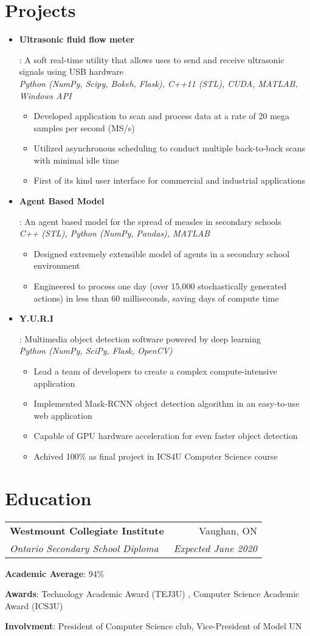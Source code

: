 \documentclass[letterpaper,10pt]{article}
\makeatletter
\newcommand{\resumeItem}[2]{
  \item\small{
    \textbf{#1}{: #2 \vspace{-2pt}}
  }
}
\newcommand{\resumeItemNoBullet}[2]{
  \item[]\small{
    \hspace{-9pt}\textbf{#1}{: #2 \vspace{-6pt}}
  }
}
\newcommand{\resumeSubheading}[4]{
  \vspace{-1pt}\item[]
  \begin{tabular*}{0.98\textwidth}{l@{\extracolsep{\fill}}r}
      \hspace{-10pt}\textbf{#1} & #2 \\
      \hspace{-10pt}\textit{\small#3} & \textit{\small #4} \\
    \end{tabular*}\vspace{-5pt}
}
\newcommand{\resumeSubItem}[2]{\resumeItem{#1}{#2}\vspace{-4pt}}
\newcommand{\resumeSubHeadingListStart}{\begin{itemize}[leftmargin=*]}
\newcommand{\resumeSubHeadingListEnd}{\end{itemize}}
\newcommand{\shorterSection}[1]{\vspace{-10pt}\section{#1}}
\makeatother
\begin{document}
\shorterSection{Projects}
  \resumeSubHeadingListStart
    \resumeSubItem{Ultrasonic fluid flow meter}
     {A soft real-time utility that allows uses to send and receive ultrasonic signals using USB hardware \\
     \emph{Python (NumPy, Scipy, Bokeh, Flask), C++11 (STL), CUDA, MATLAB, Windows API}
        \vspace{-5pt}
        \begin{itemize}
            \item Developed application to scan and process data at a rate of 20 mega samples per second (MS/s)
            \item Utilized asynchronous scheduling to conduct multiple back-to-back scans with minimal idle time
            \item First of its kind user interface for commercial and industrial applications
        \end{itemize}
     }
     \resumeSubItem{Agent Based Model}
     {An agent based model for the spread of measles in secondary schools \\
     \emph{C++ (STL), Python (NumPy, Pandas), MATLAB}
        \vspace{-5pt}
        \begin{itemize}
            \item Designed extremely extensible model of agents in a secondary school environment
            \item Engineered to process one day (over 15,000 stochastically generated actions) in less than 60 milliseconds, saving days of compute time
        \end{itemize}
     }
     \resumeSubItem{Y.U.R.I}
     {Multimedia object detection software powered by deep learning \\
     \emph{Python (NumPy, SciPy, Flask, OpenCV)}
        \vspace{-5pt}
        \begin{itemize}
            \item Lead a team of developers to create a complex compute-intensive application
            \item Implemented Mask-RCNN object detection algorithm in an easy-to-use web application
            \item Capable of GPU hardware acceleration for even faster object detection
            \item Achived 100\% as final project in ICS4U Computer Science course 
        \end{itemize}
     }
  \resumeSubHeadingListEnd

\shorterSection{Education}
  \resumeSubHeadingListStart
    \resumeSubheading
      {Westmount Collegiate Institute}{Vaughan, ON}
      {Ontario Secondary School Diploma}{Expected June 2020}{
      \resumeItemNoBullet{Academic Average}{94\%}
      \resumeItemNoBullet{Awards}{Technology Academic Award (TEJ3U) , Computer Science Academic Award (ICS3U)}
      \resumeItemNoBullet{Involvment}{President of Computer Science club, Vice-President of Model UN}
    }
  \resumeSubHeadingListEnd
\end{document}
